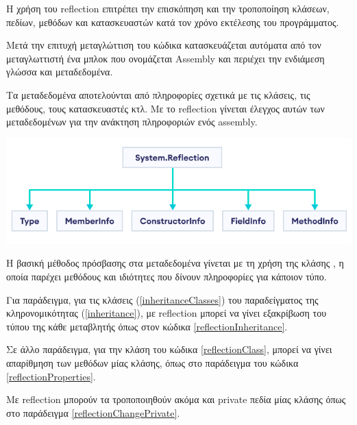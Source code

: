 \titleformat{\chapter}{}{}{0em}{\bf\LARGE}

Η χρήση του reflection επιτρέπει την επισκόπηση και την τροποποίηση κλάσεων, πεδίων, μεθόδων και κατασκευαστών κατά τον χρόνο εκτέλεσης του προγράμματος.

Μετά την επιτυχή μεταγλώττιση του κώδικα κατασκευάζεται αυτόματα από τον μεταγλωττιστή ένα μπλοκ που ονομάζεται Assembly και περιέχει την ενδιάμεση γλώσσα και μεταδεδομένα.

Τα μεταδεδομένα αποτελούνται από πληροφορίες σχετικά με τις κλάσεις, τις μεθόδους, τους κατασκευαστές κτλ. Με το reflection γίνεται έλεγχος αυτών των μεταδεδομένων για την ανάκτηση πληροφοριών ενός assembly.

\includegraphics[width=\fullwidthimage]{code/Reflection/csharp-reflection-hierarchy.png}

Η βασική μέθοδος πρόσβασης στα μεταδεδομένα γίνεται με τη χρήση της κλάσης , η οποία παρέχει μεθόδους και ιδιότητες που δίνουν πληροφορίες για κάποιον τύπο.

Για παράδειγμα, για τις κλάσεις (\ref{inheritanceClasses}) του παραδείγματος της κληρονομικότητας (\ref{inheritance}), με reflection μπορεί να γίνει εξακρίβωση του τύπου της κάθε μεταβλητής όπως στον κώδικα \ref{reflectionInheritance}.





Σε άλλο παράδειγμα, για την κλάση του κώδικα \ref{reflectionClass}, μπορεί να γίνει απαρίθμηση των μεθόδων μίας κλάσης, όπως στο παράδειγμα του κώδικα \ref{reflectionProperties}.



\newpage
Με reflection μπορούν τα τροποποιηθούν ακόμα και private πεδία μίας κλάσης όπως στο παράδειγμα \ref{reflectionChangePrivate}.



